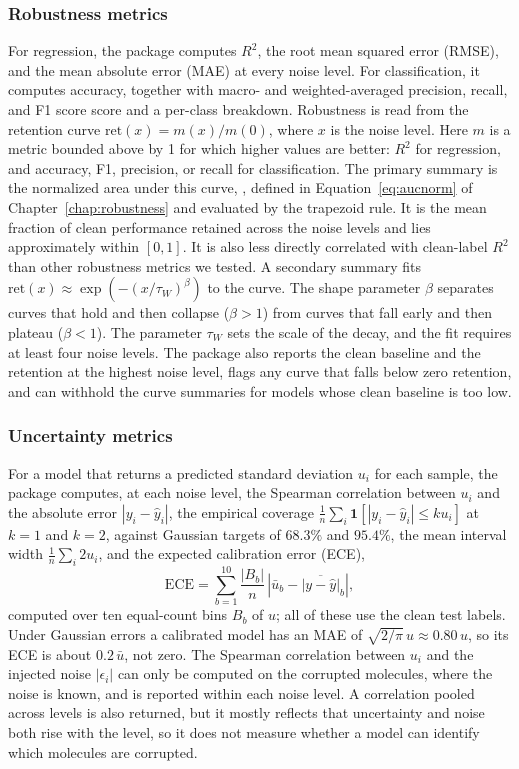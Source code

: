 \subsubsection{Robustness metrics}
For regression, the package computes $R^2$, the root mean squared error (RMSE), and the mean absolute
error (MAE) at every noise level. For classification, it computes accuracy, together with macro- and weighted-averaged precision, recall, and F1 score
score and a per-class breakdown. Robustness is read from the
retention curve $\mathrm{ret}(x) = m(x)/m(0)$, where $x$ is the noise
level. Here $m$ is a metric bounded above by 1 for which higher values are better: $R^2$ for regression, and accuracy, F1, precision, or recall for classification. The primary summary is the normalized area under this curve, \aucnorm{}, defined in Equation~\ref{eq:aucnorm} of Chapter~\ref{chap:robustness} and
evaluated by the trapezoid rule. It is the mean fraction of clean performance retained across the
noise levels and lies approximately within $[0, 1]$. It is also less directly correlated with clean-label $R^2$ than other robustness metrics we tested. A
secondary summary fits $\mathrm{ret}(x) \approx \exp\!\left(-(x/\tau_W)^{\beta}\right)$ to the curve. The shape parameter
$\beta$ separates curves that hold and then collapse ($\beta > 1$) from curves that fall early and
then plateau ($\beta < 1$). The parameter $\tau_W$ sets the scale of the decay, and the fit requires at least four
noise levels. The
package also reports the clean baseline and the retention at the highest noise level, flags any
curve that falls below zero retention, and can withhold the curve summaries for
models whose clean baseline is too low.

\subsubsection{Uncertainty metrics}
For a model that returns a predicted standard deviation
$u_i$ for each sample, the package computes, at each noise level, the Spearman correlation between $u_i$ and the
absolute error $|y_i - \hat{y}_i|$, the empirical coverage $\frac{1}{n}\sum_i \mathbf{1}\left[|y_i -
\hat{y}_i| \le k u_i\right]$ at $k = 1$ and $k = 2$, against Gaussian targets of $68.3\%$ and
$95.4\%$, the mean interval width $\frac{1}{n}\sum_i 2u_i$, and the expected calibration error (ECE),
\begin{equation}
\mathrm{ECE} = \sum_{b=1}^{10} \frac{|B_b|}{n}\,\left|\bar{u}_b - \overline{|y - \hat{y}|}_b\right|,
\label{eq:ece}
\end{equation}
computed over ten equal-count bins $B_b$ of $u$; all of these use the clean test labels. Under Gaussian errors a calibrated model has an MAE of $\sqrt{2/\pi}\,u \approx 0.80\,u$, so its ECE is about $0.2\,\bar{u}$, not zero. The Spearman
correlation between $u_i$ and the injected noise $|\epsilon_i|$ can only be computed on the corrupted molecules,
where the noise is known, and is reported
within each noise level. A correlation pooled across levels is also returned, but it
mostly reflects that uncertainty and noise both rise with the level, so it
does not measure whether a model can identify which molecules are corrupted.

